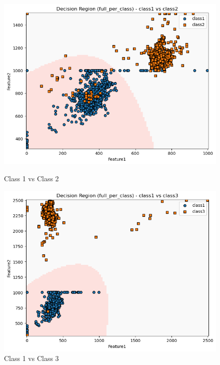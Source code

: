 \begin{figure}[H]
    \centering
    \begin{minipage}{0.32\linewidth}
        \includegraphics[width=\linewidth]{images/RD_Group04_images/04_full_per_class/02_decision_region_c1_c2.png}
        \caption*{Class 1 vs Class 2}
    \end{minipage}
    \hfill
    \begin{minipage}{0.32\linewidth}
        \includegraphics[width=\linewidth]{images/RD_Group04_images/04_full_per_class/03_decision_region_c1_c3.png}
        \caption*{Class 1 vs Class 3}
    \end{minipage}
    \hfill
    \begin{minipage}{0.32\linewidth}

\end{minipage}
\end{figure}
